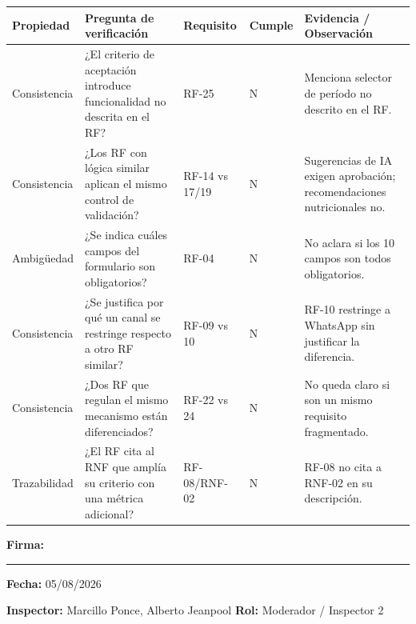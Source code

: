 \documentclass[11pt,a4paper]{article}
\begin{document}
\begin{longtable}{p{2.0cm}p{3.2cm}p{1.6cm}p{1.0cm}p{4.0cm}}
\toprule
\textbf{Propiedad} & \textbf{Pregunta de verificación} & \textbf{Requisito} & \textbf{Cumple} & \textbf{Evidencia / Observación} \\
\midrule
\endhead
Consistencia & ¿El criterio de aceptación introduce funcionalidad no descrita en el RF? & RF-25 & N & Menciona selector de período no descrito en el RF. \\
Consistencia & ¿Los RF con lógica similar aplican el mismo control de validación? & RF-14 vs 17/19 & N & Sugerencias de IA exigen aprobación; recomendaciones nutricionales no. \\
Ambigüedad & ¿Se indica cuáles campos del formulario son obligatorios? & RF-04 & N & No aclara si los 10 campos son todos obligatorios. \\
Consistencia & ¿Se justifica por qué un canal se restringe respecto a otro RF similar? & RF-09 vs 10 & N & RF-10 restringe a WhatsApp sin justificar la diferencia. \\
Consistencia & ¿Dos RF que regulan el mismo mecanismo están diferenciados? & RF-22 vs 24 & N & No queda claro si son un mismo requisito fragmentado. \\
Trazabilidad & ¿El RF cita al RNF que amplía su criterio con una métrica adicional? & RF-08/RNF-02 & N & RF-08 no cita a RNF-02 en su descripción. \\
\bottomrule
\end{longtable}
\textbf{Firma:} \rule{4cm}{0.4pt} \hfill \textbf{Fecha:} 05/08/2026

\vspace{0.4cm}
\textbf{Inspector:} Marcillo Ponce, Alberto Jeanpool \hfill \textbf{Rol:} Moderador / Inspector 2
\end{document}
